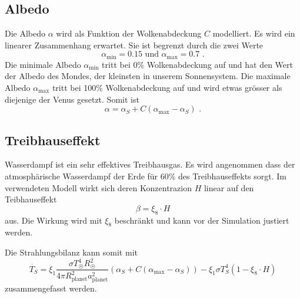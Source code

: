 \begin{refsection}
\subsection{Albedo}
Die Albedo $\alpha$ wird als Funktion der Wolkenabdeckung $C$ modelliert. Es wird ein linearer Zusammenhang erwartet. Sie ist begrenzt durch die zwei Werte
\begin{equation}
\alpha_{\text{min}} = 0.15 \text{ und } \alpha_{\text{max}} = 0.7 \text{ .}
\end{equation}
Die minimale Albedo $\alpha_{\text{min}}$ tritt bei 0\% Wolkenabdeckung auf und hat den Wert der Albedo des Mondes, der kleinsten in unserem Sonnensystem. Die maximale Albedo $\alpha_{\text{max}}$ tritt bei 100\% Wolkenabdeckung auf und wird etwas grösser als diejenige der Venus gesetzt. Somit ist
\begin{equation}
\alpha = \alpha_S + C(\alpha_{\text{max}} - \alpha_S) \text{ .}
\end{equation}

\subsection{Treibhauseffekt}
Wasserdampf ist ein sehr effektives Treibhausgas. Es wird angenommen dass der atmosphärische Wasserdampf der Erde für 60\% des Treibhauseffekts sorgt.  
Im verwendeten Modell wirkt sich deren Konzentrazion $H$ linear auf den Teibhauseffekt 
\begin{equation}
\beta  = \xi_8 \cdot H
\end{equation}
aus. Die Wirkung wird mit $\xi_8$ beschränkt und kann vor der Simulation justiert werden.

Die Strahlungsbilanz kann somit mit
\begin{equation}
\dot{T_S} = \xi_1 \frac{\sigma T_{\astrosun}^4 R_{\astrosun}^2}{4 \pi R_{\text{planet}}^2 a_{\text{planet}}^2} (\alpha_S + C(\alpha_{\text{max}} - \alpha_S)) - \xi_1 \sigma T_{S}^4  (1 - \xi_8 \cdot H)
\end{equation}
zusammengefasst werden.


\end{refsection}
